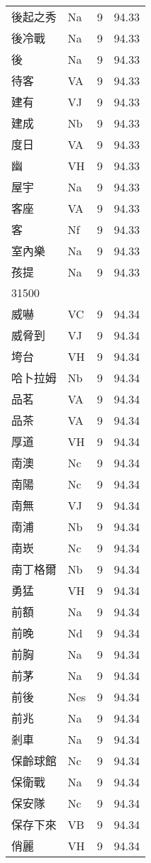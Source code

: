\documentclass[twocolumn]{book}
\begin{document}
\begin{supertabular}{llrr}
後起之秀 & Na & 9 &  94.33\\
後冷戰 & Na & 9 &  94.33\\
後 & Na & 9 &  94.33\\
待客 & VA & 9 &  94.33\\
建有 & VJ & 9 &  94.33\\
建成 & Nb & 9 &  94.33\\
度日 & VA & 9 &  94.33\\
幽 & VH & 9 &  94.33\\
屋宇 & Na & 9 &  94.33\\
客座 & VA & 9 &  94.33\\
客 & Nf & 9 &  94.33\\
室內樂 & Na & 9 &  94.33\\
孩提 & Na & 9 &  94.33\\
31500\\
威嚇 & VC & 9 &  94.34\\
威脅到 & VJ & 9 &  94.34\\
垮台 & VH & 9 &  94.34\\
哈卜拉姆 & Nb & 9 &  94.34\\
品茗 & VA & 9 &  94.34\\
品茶 & VA & 9 &  94.34\\
厚道 & VH & 9 &  94.34\\
南澳 & Nc & 9 &  94.34\\
南陽 & Nc & 9 &  94.34\\
南無 & VJ & 9 &  94.34\\
南浦 & Nb & 9 &  94.34\\
南崁 & Nc & 9 &  94.34\\
南丁格爾 & Nb & 9 &  94.34\\
勇猛 & VH & 9 &  94.34\\
前額 & Na & 9 &  94.34\\
前晚 & Nd & 9 &  94.34\\
前胸 & Na & 9 &  94.34\\
前茅 & Na & 9 &  94.34\\
前後 & Nes & 9 &  94.34\\
前兆 & Na & 9 &  94.34\\
剎車 & Na & 9 &  94.34\\
保齡球館 & Nc & 9 &  94.34\\
保衛戰 & Na & 9 &  94.34\\
保安隊 & Nc & 9 &  94.34\\
保存下來 & VB & 9 &  94.34\\
俏麗 & VH & 9 &  94.34\\

\end{supertabular}
\end{document}
